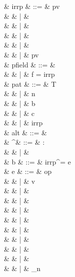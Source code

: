 \documentclass[a4paper]{article}
\begin{document}
\small
\begin{grammar}
   & irrp & ::= & pv \\
                        &      & |   &  \\
                        &      & |   &  \\
                        &      & |   & \sWILDCARD \\
                        &      & |   & \sunit \\
                        &      & |   & pv\  \\
   & pfield & ::= & \sALLFIELDS \\
                       &        & |   & f = irrp \\
   & pat & ::= & T\  \\
                 &     & |   & n\\
                 &     & |   & b\\
                 &     & |   & c\\
                 &     & |   & irrp\\
   & alt & ::= & \\
   & \cdot^\tau & ::= & \cdot : \tau \\
                         &          & |   & \cdot \\
   & b & ::= & irrp^\tau = e\ \sBANG {} \\
   & e & ::= & op\  \\
                    &   & |   & v \\
                    &   & |   &  \\
                    &   & |   &  \\
                    &   & |   &  \\
                    &   & |   &  \\
                    &   & |   &  \\
                    &   & |   &  \\
                    &   & |   &  \\
                    &   & |   & \sunit \\
                    &   & |   & \ell_n \\

\end{grammar}
\end{document}
